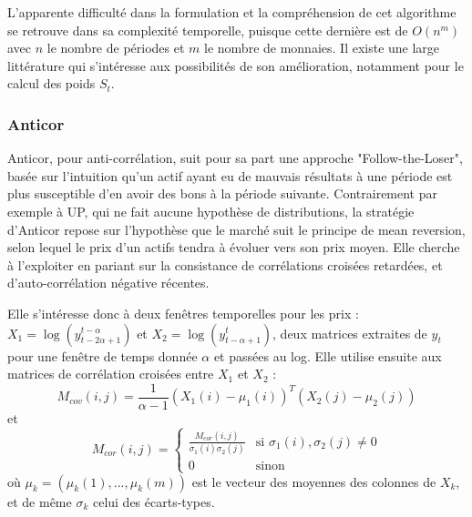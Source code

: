 \documentclass[a4paper, 10pt]{article}
\begin{document}
L'apparente difficulté dans la formulation et la compréhension de cet algorithme se retrouve dans sa complexité temporelle, puisque cette dernière est de $O(n^m)$ avec $n$ le nombre de périodes et $m$ le nombre de monnaies. Il existe une large littérature qui s'intéresse aux possibilités de son amélioration, notamment pour le calcul des poids $S_t$.

\subsubsection{Anticor}

Anticor, pour anti-corrélation, suit pour sa part une approche "Follow-the-Loser", basée sur l'intuition qu'un actif ayant eu de mauvais résultats à une période est plus susceptible d'en avoir des bons à la période suivante. Contrairement par exemple à UP, qui ne fait aucune hypothèse de distributions, la stratégie d'Anticor repose sur l'hypothèse que le marché suit le principe de mean reversion, selon lequel le prix d'un actifs tendra à évoluer vers son prix moyen. Elle cherche à l'exploiter en pariant sur la consistance de corrélations croisées retardées, et d'auto-corrélation négative récentes.

Elle s'intéresse donc à deux fenêtres temporelles pour les prix : $X_1 = \log \left(y_{t-2\alpha+1}^{t-\alpha} \right)$ et $X_2 = \log \left(y_{t-\alpha+1}^{t}\right)$, deux matrices extraites de $y_t$ pour une fenêtre de temps donnée $\alpha$ et passées au log. Elle utilise ensuite aux matrices de corrélation croisées entre $X_1$ et $X_2$ : 
\begin{equation}
    M_{cov}(i, j) = \frac{1}{\alpha - 1}(X_{1}(i) - \mu_1(i))^{T}(X_2(j) - \mu_2(j))
\end{equation}
et
\begin{equation}
    M_{cor}(i, j) =
        \begin{cases}
            \frac{M_{cor}(i,j)}{\sigma_1(i)\sigma_2(j)} & \text{si } \sigma_1(i), \sigma_2(j) \ne 0 \\
            0                                           & \text{sinon}
        \end{cases}
\end{equation}
où $\mu_k = (\mu_k(1), ..., \mu_k(m))$ est le vecteur des moyennes des colonnes de $X_k$, et de même $\sigma_k$ celui des écarts-types.
\end{document}
